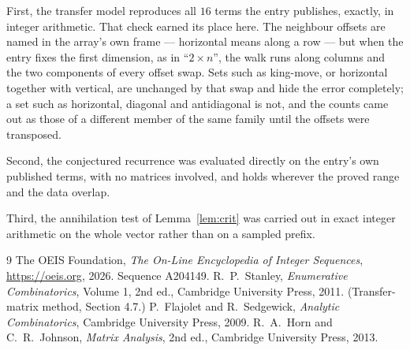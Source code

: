 \documentclass[11pt,a4paper]{article}
\theoremstyle{plain}
\theoremstyle{definition}
\begin{document}
First, the transfer model reproduces all $16$ terms the entry publishes, exactly, in
integer arithmetic. That check earned its place here. The neighbour offsets are named in the
array's own frame --- horizontal means along a row --- but when the entry fixes the first
dimension, as in ``$2\times n$'', the walk runs along columns and the two components of every
offset swap. Sets such as king-move, or horizontal together with vertical, are unchanged by
that swap and hide the error completely; a set such as horizontal, diagonal and antidiagonal
is not, and the counts came out as those of a different member of the same family until the
offsets were transposed.

Second, the conjectured recurrence was evaluated directly on the entry's own published terms,
with no matrices involved, and holds wherever the proved range and the data overlap.

Third, the annihilation test of Lemma~\ref{lem:crit} was carried out in exact integer
arithmetic on the whole vector rather than on a sampled prefix.

\begin{thebibliography}{9}
 The OEIS Foundation, \emph{The On-Line Encyclopedia of Integer
Sequences}, \url{https://oeis.org}, 2026. Sequence A204149.
 R.~P.~Stanley, \emph{Enumerative Combinatorics}, Volume 1, 2nd ed.,
Cambridge University Press, 2011. (Transfer-matrix method, Section 4.7.)
 P.~Flajolet and R.~Sedgewick, \emph{Analytic Combinatorics}, Cambridge
University Press, 2009.
 R.~A.~Horn and C.~R.~Johnson, \emph{Matrix Analysis}, 2nd ed., Cambridge
University Press, 2013.
\end{thebibliography}
\end{document}
